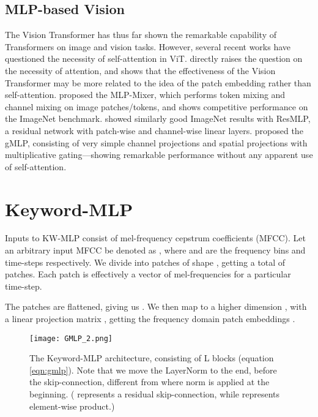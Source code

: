 \documentclass{article} \usepackage{iclr2022_conference,times}
\begin{document}
\subsection{MLP-based Vision}
The Vision Transformer \citep{dosovitskiy2020image} has thus far shown the remarkable capability of Transformers on image and vision tasks. However, several recent works have questioned the necessity of self-attention in ViT. \citet{melas2021you} directly raises the question on the necessity of attention, and shows that the effectiveness of the Vision Transformer may be more related to the idea of the patch embedding rather than self-attention. \citet{tolstikhin2021mlp} proposed the MLP-Mixer, which performs token mixing and channel mixing on image patches/tokens, and shows competitive performance on the ImageNet benchmark. \citet{touvron2021resmlp} showed similarly good ImageNet results with ResMLP, a residual network with patch-wise and channel-wise linear layers. \citet{liu2021pay} proposed the gMLP, consisting of very simple channel projections and spatial projections with multiplicative gating---showing remarkable performance without any apparent use of self-attention.

\section{Keyword-MLP}
\label{sec:proposed-method}

Inputs to KW-MLP consist of mel-frequency cepstrum coefficients (MFCC). Let an arbitrary input MFCC be denoted as , where  and  are the frequency bins and time-steps respectively. We divide  into patches of shape , getting a total of  patches. Each patch is effectively a vector of mel-frequencies for a particular time-step. 

The  patches are flattened, giving us . We then map  to a higher dimension , with a linear projection matrix , getting the frequency domain patch embeddings .



\begin{figure}[ht]
\centering
    \texttt{[image: GMLP\_2.png]}
\caption{The Keyword-MLP architecture, consisting of L blocks (equation \ref{eqn:gmlp}). Note that we move the LayerNorm to the end, before the skip-connection, different from \citet{liu2021pay} where norm is applied at the beginning. ( represents a residual skip-connection, while  represents element-wise product.)}

\label{fig:kw-mlp}
\end{figure}
\end{document}
